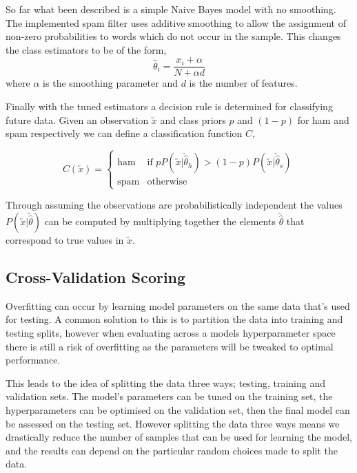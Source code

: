 \documentclass[12pt, a4paper]{article}
\begin{document}
  So far what been described is a simple Naive Bayes model with no smoothing. The implemented spam filter uses additive smoothing to allow the assignment of non-zero probabilities to words which do not occur in the sample. This changes the class estimators to be of the form,
  $$ \hat{\theta}_i = \frac{x_i + \alpha}{N + \alpha d} $$
  where $\alpha$ is the smoothing parameter and $d$ is the number of features.

  Finally with the tuned estimators a decision rule is determined for classifying future data. Given an observation $\utilde{x}$ and class priors $p$ and $(1-p)$ for ham and spam respectively we can define a classification function $C$,

  $$
    C(\utilde{x}) = \begin{cases}
      \text{ham} & \text{if } p P(\utilde{x}|\utilde{\hat{\theta}}_h) > (1-p) P(\utilde{x}|\utilde{\hat{\theta}}_s) \\
      \text{spam}  & \text{otherwise}
    \end{cases}
  $$

  Through assuming the observations are probabilistically independent the values $P(\utilde{x}|\utilde{\hat{\theta}})$ can be computed by multiplying together the elements $\utilde{\hat{\theta}}$ that correspond to true values in $\utilde{x}$.


  \subsection{Cross-Validation Scoring}

  Overfitting can occur by learning model parameters on the same data that's used for testing. A common solution to this is to partition the data into training and testing splits, however when evaluating across a models hyperparameter space there is still a risk of overfitting as the parameters will be tweaked to optimal performance.

  This leads to the idea of splitting the data three ways; testing, training and validation sets. The model's parameters can be tuned on the training set, the hyperparameters can be optimised on the validation set, then the final model can be assessed on the testing set. However splitting the data three ways means we drastically reduce the number of samples that can be used for learning the model, and the results can depend on the particular random choices made to split the data.
\end{document}
